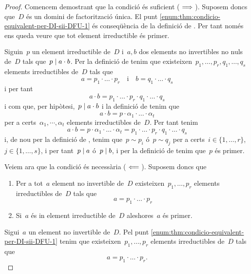 \documentclass[../estructures-algebraiques.tex]{subfiles}
\begin{document}
    \begin{proof}
        Comencem demostrant que la condició és suficient (\(\implies\)).
        Suposem doncs que~\(D\) és un domini de factorització única.
        El punt \eqref{enum:thm:condicio-equivalent-per-DI-sii-DFU-1} és conseqüència de la definició de .
        Per tant només ens queda veure que tot element irreductible és primer.

        Siguin~\(p\) un element irreductible de~\(D\) i~\(a,b\) dos elements no invertibles no nuls de~\(D\) tals que~\(p\mathrel{|} a\cdot b\).
        Per la definició de  tenim que existeixen~\(p_{1},\dots,p_{r},q_{1},\dots,q_{s}\) elements irreductibles de~\(D\) tals que
        \[
            a=p_{1}\cdot\ldots\cdot p_{r}\quad\text{i}\quad b=q_{1}\cdot\ldots\cdot q_{s}
        \]
        i per tant
        \[
            a\cdot b=p_{1}\cdot\ldots\cdot p_{r}\cdot q_{1}\cdot\ldots\cdot q_{s}
        \]
        i com que, per hipòtesi,~\(p\mathrel{|} a\cdot b\) i la definició de  tenim que
        \[
            a\cdot b=p\cdot\alpha_{1}\cdot\ldots\cdot\alpha_{t}
        \]
        per a certs~\(\alpha_{1},\cdots,\alpha_{t}\) elements irreductibles de~\(D\).
        Per tant tenim
        \[
            a\cdot b=p\cdot\alpha_{1}\cdot\ldots\cdot\alpha_{t}=p_{1}\cdot\ldots\cdot p_{r}\cdot q_{1}\cdot\ldots\cdot q_{s}
        \]
        i, de nou per la definició de , tenim que~\(p\sim p_{i}\) ó~\(p\sim q_{j}\) per a certs~\(i\in\{1,\dots,r\}\),~\(j\in\{1,\dots,s\}\), i per tant~\(p\mathrel{|} a\) ó~\(p\mathrel{|} b\), i per la definició de  tenim que~\(p\) és primer.

        Veiem ara que la condició és necessària (\(\impliedby\)).
        Suposem doncs que
        \begin{enumerate}
            \item Per a tot~\(a\) element no invertible de~\(D\) existeixen~\(p_{1},\dots,p_{r}\) elements irreductibles de~\(D\) tals que
            \[
                a=p_{1}\cdot\ldots\cdot p_{r}
            \]
            \item Si~\(a\) és in element irreductible de~\(D\) aleshores~\(a\) és primer.
        \end{enumerate}
        Sigui~\(a\) un element no invertible de~\(D\).
        Pel punt \eqref{enum:thm:condicio-equivalent-per-DI-sii-DFU-1} tenim que existeixen~\(p_{1},\dots,p_{r}\) elements irreductibles de~\(D\) tals que
        \[
            a=p_{1}\cdot\ldots\cdot p_{r}.
        \]


\end{proof}
\end{document}
